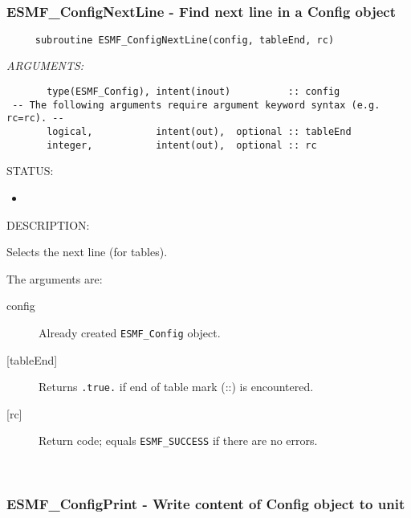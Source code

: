  
\mbox{}\hrulefill\ 
 

  \subsubsection [ESMF\_ConfigNextLine] {ESMF\_ConfigNextLine - Find next line in a Config object}


  
\begin{verbatim}     subroutine ESMF_ConfigNextLine(config, tableEnd, rc)
 \end{verbatim}{\em ARGUMENTS:}
\begin{verbatim}       type(ESMF_Config), intent(inout)          :: config 
 -- The following arguments require argument keyword syntax (e.g. rc=rc). --
       logical,           intent(out),  optional :: tableEnd
       integer,           intent(out),  optional :: rc \end{verbatim}
{\sf STATUS:}
   \begin{itemize}
   \item{}
   \end{itemize}
  
{\sf DESCRIPTION:\\ }

 
     Selects the next line (for tables).
  
     The arguments are:
     \begin{description}
     \item [config]
       Already created {\tt ESMF\_Config} object.
     \item [{[tableEnd]}]
       Returns {\tt .true.} if end of table mark (::) is encountered.
     \item [{[rc]}]
       Return code; equals {\tt ESMF\_SUCCESS} if there are no errors.
     \end{description}
  
 
\mbox{}\hrulefill\ 
 

  \subsubsection [ESMF\_ConfigPrint] {ESMF\_ConfigPrint - Write content of Config object to unit}


